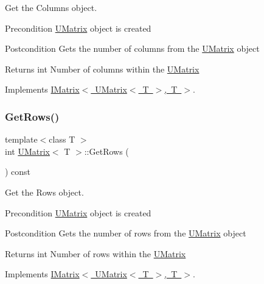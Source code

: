 Get the Columns object. 

\begin{DoxyPrecond}{Precondition}
\mbox{\hyperlink{class_u_matrix}{U\+Matrix}} object is created 
\end{DoxyPrecond}
\begin{DoxyPostcond}{Postcondition}
Gets the number of columns from the \mbox{\hyperlink{class_u_matrix}{U\+Matrix}} object 
\end{DoxyPostcond}
\begin{DoxyReturn}{Returns}
int Number of columns within the \mbox{\hyperlink{class_u_matrix}{U\+Matrix}} 
\end{DoxyReturn}


Implements \mbox{\hyperlink{class_i_matrix_a3b84da3898ef38bdf281c13f218fc278}{I\+Matrix$<$ U\+Matrix$<$ T $>$, T $>$}}.

\mbox{\label{class_u_matrix_ae261286236cb23a0dfa1296591f4c3ad}} 
\subsubsection{\texorpdfstring{GetRows()}{GetRows()}}
{\footnotesize\ttfamily template$<$class T $>$ \\
int \mbox{\hyperlink{class_u_matrix}{U\+Matrix}}$<$ T $>$\+::Get\+Rows (\begin{DoxyParamCaption}{ }\end{DoxyParamCaption}) const\hspace{0.3cm}{\ttfamily [virtual]}}



Get the Rows object. 

\begin{DoxyPrecond}{Precondition}
\mbox{\hyperlink{class_u_matrix}{U\+Matrix}} object is created 
\end{DoxyPrecond}
\begin{DoxyPostcond}{Postcondition}
Gets the number of rows from the \mbox{\hyperlink{class_u_matrix}{U\+Matrix}} object 
\end{DoxyPostcond}
\begin{DoxyReturn}{Returns}
int Number of rows within the \mbox{\hyperlink{class_u_matrix}{U\+Matrix}} 
\end{DoxyReturn}


Implements \mbox{\hyperlink{class_i_matrix_a58632b018f4023768db7963e22f468da}{I\+Matrix$<$ U\+Matrix$<$ T $>$, T $>$}}.

